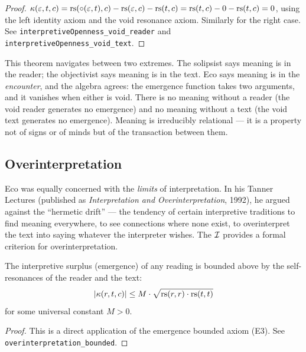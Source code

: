 \begin{proof}
$\kappa(\varepsilon, t, c) = \mathrm{rs}(\circ(\varepsilon, t), c) - \mathrm{rs}(\varepsilon, c)
- \mathrm{rs}(t, c) = \mathrm{rs}(t, c) - 0 - \mathrm{rs}(t, c) = 0$, using the left
identity axiom and the void resonance axiom. Similarly for the right
case. See \texttt{interpretiveOpenness\_void\_reader} and
\texttt{interpretiveOpenness\_void\_text}.
\end{proof}

\begin{interpretation}
This theorem navigates between two extremes. The solipsist says meaning
is in the reader; the objectivist says meaning is in the text. Eco
says meaning is in the \emph{encounter}, and the algebra agrees: the
emergence function takes two arguments, and it vanishes when either is
void. There is no meaning without a reader (the void reader generates
no emergence) and no meaning without a text (the void text generates no
emergence). Meaning is irreducibly relational --- it is a property not
of signs or of minds but of the transaction between them.
\end{interpretation}

\subsection{Overinterpretation}

Eco was equally concerned with the \emph{limits} of interpretation.
In his Tanner Lectures (published as \textit{Interpretation and
Overinterpretation}, 1992), he argued against the ``hermetic drift''
--- the tendency of certain interpretive traditions to find meaning
everywhere, to see connections where none exist, to overinterpret the
text into saying whatever the interpreter wishes. The $\mathcal{I}$ provides a
formal criterion for overinterpretation.

\begin{theorem}
\label{thm:overinterpretation-bounded}
The interpretive surplus (emergence) of any reading is bounded above
by the self-resonances of the reader and the text:
\[
  |\kappa(r, t, c)| \leq M \cdot \sqrt{\mathrm{rs}(r, r) \cdot \mathrm{rs}(t, t)}
\]
for some universal constant $M > 0$.
\end{theorem}

\begin{proof}
This is a direct application of the emergence bounded axiom (E3).
See \texttt{overinterpretation\_bounded}.
\end{proof}

